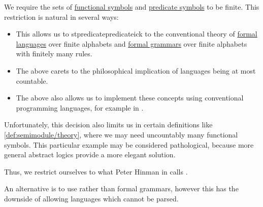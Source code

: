 \begin{remark}\label{rem:uncountable_first_order_language}
  We require the sets of \hyperref[def:first_order_language/fun]{functional symbols} and \hyperref[def:first_order_language/fun]{predicate symbols} to be finite. This restriction is natural in several ways:
  \begin{itemize}
    \item This allows us to stpredicatepredicateick to the conventional theory of \hyperref[def:formal_language/language]{formal languages} over finite alphabets and \hyperref[def:formal_grammar]{formal grammars} over finite alphabets with finitely many rules.

    \item The above carets to the philosophical implication of languages being at most countable.

    \item The above also allows us to implement these concepts using conventional programming languages, for example in \cite{notebook:code}.
  \end{itemize}

  Unfortunately, this decision also limits us in certain definitions like \cref{def:semimodule/theory}, where we may need uncountably many functional symbols. This particular example may be considered pathological, because more general abstract logics provide a more elegant solution.

  Thus, we restrict ourselves to what Peter Hinman in  calls .

  An alternative is to use  rather than formal grammars, however this has the downside of allowing languages which cannot be parsed.
\end{remark}

